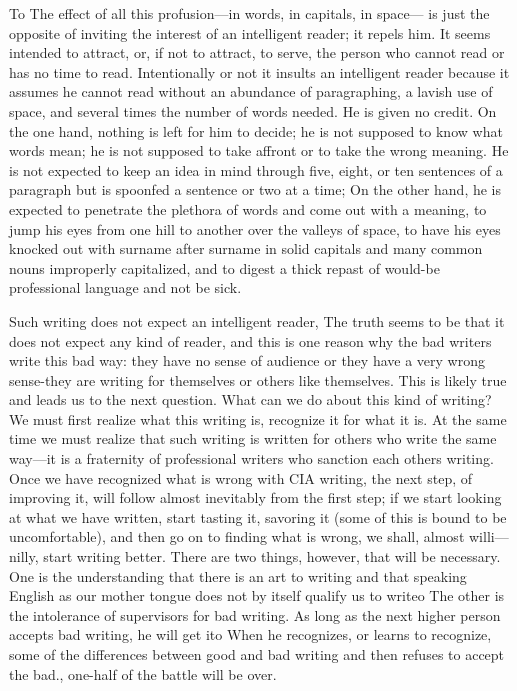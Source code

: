 \documentclass[
    oneside,
    11pt,
    draft
]{memoir}
\begin{document}
To The effect of all this profusion---in words, in capitals, in space--- is just the opposite of inviting the interest of an intelligent reader; it repels him. It seems intended to attract, or, if not to attract, to serve, the person who cannot read or has no time to read. Intentionally or not it insults an intelligent reader because it assumes he cannot read without an abundance of paragraphing, a lavish use of space, and several times the number of words needed. He is given no credit. On the one hand, nothing is left for him to decide; he is not supposed to know what words mean; he is not supposed to take affront or to take the wrong meaning. He is not expected to keep an idea in mind through five, eight, or ten sentences of a paragraph but is spoonfed a sentence or two at a time; On the other hand, he is expected to penetrate the plethora of words and come out with a meaning, to jump his eyes from one hill to another over the valleys of space, to have his eyes knocked out with surname after surname in solid capitals and many common nouns improperly capitalized, and to digest a thick repast of would-be professional language and not be sick.

Such writing does not expect an intelligent reader, The truth seems to be that it does not expect any kind of reader, and this is one reason why the bad writers write this bad way: they have no sense of audience or they have a very wrong sense-they are writing for themselves or others like themselves. This is likely true and leads us to the next question. What can we do about this kind of writing? We must first realize what this writing is, recognize it for what it is. At the same time we must realize that such writing is written for others who write the same way---it is a fraternity of professional writers who sanction each others writing. Once we have recognized what is wrong with CIA writing, the next step, of improving it, will follow almost inevitably from the first step; if we start looking at what we have written, start tasting it, savoring it (some of this is bound to be uncomfortable), and then go on to finding what is wrong, we shall, almost willi---nilly, start writing better. There are two things, however, that will be necessary. One is the understanding that there is an art to writing and that speaking English as our mother tongue does not by itself qualify us to writeo The other is the intolerance of supervisors for bad writing. As long as the next higher person accepts bad writing, he will get ito When he recognizes, or learns to recognize, some of the differences between good and bad writing and then refuses to accept the bad., one-half of the battle will be over.
\end{document}
